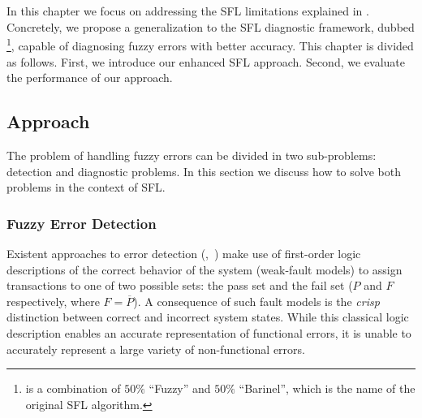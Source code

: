 \renewcommand{\BrainFuckChapter}{
  {-}{[}{-}{-}{-}{-}{-}{-}{-}{>}{+}{<}{]}{>}{-}{-}{-}{.}{[}{+}{+}{>}{-}{-}{-}{-}{-}{-}{-}{<}{]}{>}{.}{+}{+}{+}{+}{+}{.}{.}{-}{-}{[}{-}{>}{+}{+}{+}{<}{]}{>}{+}{.}{+}{+}{+}{+}{+}{.}{-}{-}{-}{-}{-}{-}{-}{-}{-}{.}{+}
  {+}{+}{+}{+}{+}{+}{.}{-}{>}{<}{-}{-}{<}{>}{<}{>}{<}{-}{-}{-}{+}{+}{+}{>}{-}{-}{<}{+}{>}{>}{<}{+}{>}{>}{<}{-}{<}{>}{+}{>}{<}{-}{+}{-}{+}{+}{>}{-}{+}{-}{-}{-}{>}{<}{<}{+}{+}{-}{+}{<}{>}{<}{<}{+}{<}{>}{+}{-}{+}{>}
}
\renewcommand{\LifeChapter}{y}

\chapter{\fuzzinel}
\label{sec:fuzzinel}
In this chapter we focus on addressing the \ac{SFL} limitations
explained in .
%
Concretely, we propose a generalization to the \ac{SFL} diagnostic
framework, dubbed \fuzzinel{}\footnote{\fuzzinel{} is a combination of
  $50\%$ ``Fuzzy'' and $50\%$ ``Barinel'', which is the name of the
  original \ac{SFL} algorithm.}, capable of diagnosing fuzzy errors
with better accuracy.
%
This chapter is divided as follows.
%
First, we introduce our enhanced \ac{SFL} approach.
%
Second, we evaluate the performance of our approach.

\section{Approach}
\label{sec:fuzzinel:approach}
The problem of handling fuzzy errors can be divided in two
sub-problems: detection and diagnostic problems.
%
In this section we discuss how to solve both problems in the context
of \ac{SFL}.

\subsection{Fuzzy Error Detection}
\label{sec:fuzzinel:approach:fuzzy-error-detection}
Existent approaches to error detection (\eg,~\citep{Casanova13}) make
use of first-order logic descriptions of the correct behavior of the
system (weak-fault models) to assign transactions to one of two
possible sets: the pass set and the fail set ($P$ and $F$
respectively, where $F = \overline{P}$).
%
A consequence of such fault models is the \textit{crisp} distinction
between correct and incorrect system states.
%
While this classical logic description enables an accurate
representation of functional errors, it is unable to accurately
represent a large variety of non-functional errors.

